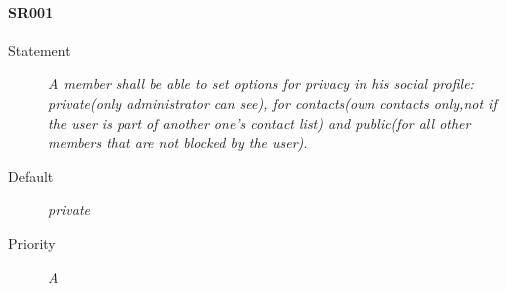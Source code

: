 \paragraph{SR001}
  \begin{description}
  \item [Statement] 
    \textit{ A member shall be able to set options for privacy in his social profile:
			 private(only administrator can see),
			 for contacts(own contacts only,not if the user is part of another one's contact list)
			 and public(for all other members that are not blocked by the user).}
  \item [Default] \textit{private}
  \item [Priority] \textit{A}
\end{description}